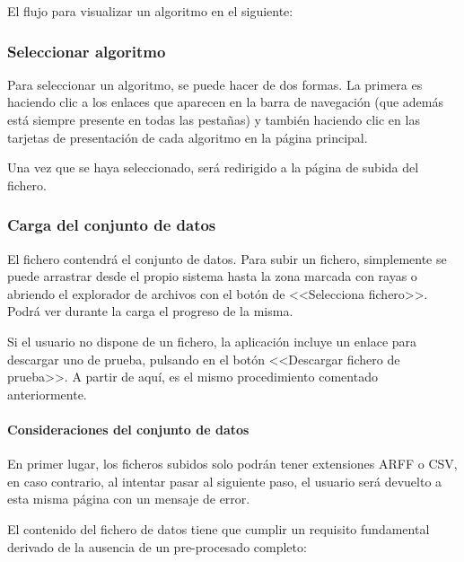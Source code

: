 El flujo para visualizar un algoritmo en el siguiente:


\subsubsection{Seleccionar algoritmo}
Para seleccionar un algoritmo, se puede hacer de dos formas. La primera es
haciendo clic a los enlaces que aparecen en la barra de navegación (que además
está siempre presente en todas las pestañas) y también haciendo clic en las
tarjetas de presentación de cada algoritmo en la página principal.


Una vez que se haya seleccionado, será redirigido a la página de subida del
fichero. 

\subsubsection{Carga del conjunto de datos}

El fichero contendrá el conjunto de datos. Para subir un fichero, simplemente se
puede arrastrar desde el propio sistema hasta la zona marcada con rayas o
abriendo el explorador de archivos con el botón de <<Selecciona fichero>>. Podrá
ver durante la carga el progreso de la misma.

Si el usuario no dispone de un fichero, la aplicación incluye un enlace para
descargar uno de prueba, pulsando en el botón <<Descargar fichero de prueba>>. A
partir de aquí, es el mismo procedimiento comentado anteriormente.


\paragraph{Consideraciones del conjunto de datos} En primer lugar, los ficheros
subidos solo podrán tener extensiones ARFF o CSV, en caso contrario, al intentar
pasar al siguiente paso, el usuario será devuelto a esta misma página con un
mensaje de error.

El contenido del fichero de datos tiene que cumplir un requisito fundamental
derivado de la ausencia de un pre-procesado completo: 

